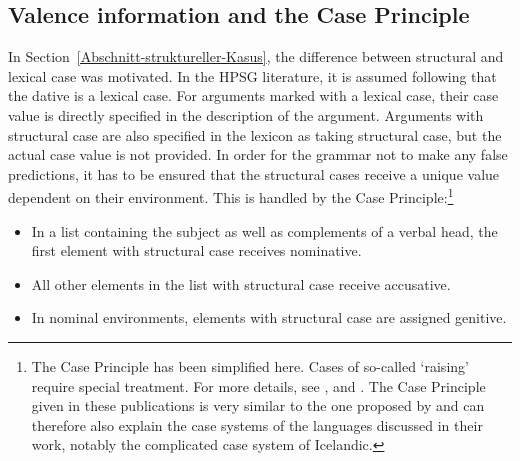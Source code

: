 \subsection{Valence information and the Case Principle}

In Section~\ref{Abschnitt-struktureller-Kasus}, the difference between structural
and lexical case was motivated. In the HPSG literature, it is assumed following \citet{Haider86}
that the dative is a lexical case. For arguments marked with a lexical case, their case value is
directly specified in the description of the argument. Arguments with structural case are also
specified in the lexicon as taking structural case, but the actual case value is not provided. In
order for the grammar not to make any false predictions, it has to be ensured that the structural
cases receive a unique value dependent on their 
environment. This is handled by the Case Principle:\footnote{%
	The Case Principle has been simplified here. Cases of so-called `raising' require special treatment.
	For more details, see ,  and . The Case Principle given in these publications is very similar to the one proposed by \citet*{YMJ87}
	and can therefore also explain the case systems of the languages discussed in their work, notably the complicated
	case system of Icelandic.
}
\begin{principle-break}
\label{case-p}
\begin{itemize}
\item In a list containing the subject as well as complements of a verbal head, the first element with
structural case receives nominative.
\item All other elements in the list with structural case receive accusative.
\item In nominal environments, elements with structural case are assigned genitive.
\end{itemize}
\end{principle-break}

